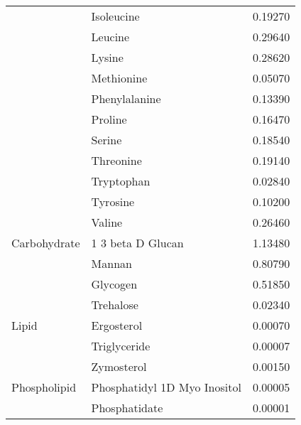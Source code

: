 \begin{table}
\begin{footnotesize}
\begin{tabular}{l l r}
                   & Isoleucine                     &  0.19270                             \\
                   & Leucine                        &  0.29640                             \\
                   & Lysine                         &  0.28620                             \\
                   & Methionine                     &  0.05070                             \\
                   & Phenylalanine                  &  0.13390                             \\
                   & Proline                        &  0.16470                             \\
                   & Serine                         &  0.18540                             \\
                   & Threonine                      &  0.19140                             \\
                   & Tryptophan                     &  0.02840                             \\
                   & Tyrosine                       &  0.10200                             \\
                   & Valine                         &  0.26460                             \\ \midrule
      Carbohydrate & 1 3 beta D Glucan              &  1.13480                             \\
                   & Mannan                         &  0.80790                             \\
                   & Glycogen                       &  0.51850                             \\
                   & Trehalose                      &  0.02340                             \\ \midrule
      Lipid        & Ergosterol                     &  0.00070                             \\
                   & Triglyceride                   &  0.00007                             \\
                   & Zymosterol                     &  0.00150                             \\
      Phospholipid & Phosphatidyl 1D Myo Inositol   &  0.00005                             \\
                   & Phosphatidate                  &  0.00001                             \\

\end{tabular}
\end{footnotesize}
\end{table}

